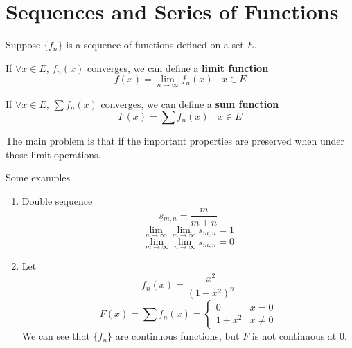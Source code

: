 \section{Sequences and Series of Functions}
    \begin{defi}
        Suppose $\{f_n\}$ is a sequence of functions defined on a set $E$. 
        
        If $\forall x \in E$, $f_n(x)$ converges, we can define a \textbf{limit function}
        \begin{equation}
            f(x) = \lim_{n \to \infty} f_n(x) \ \ \ \ x \in E
        \end{equation}

        If $\forall x \in E$, $\sum f_n(x)$ converges, we can define a \textbf{sum function}
        \begin{equation}
            F(x) = \sum f_n(x) \ \ \ \ x \in E
        \end{equation}
    \end{defi}

    The main problem is that if the important properties are preserved when under those limit operations.

    Some examples
    \begin{enumerate}
        \item Double sequence
        \begin{equation}
            s_{m,n} = \frac{m}{m+n}
        \end{equation}
        \begin{equation}
            \lim_{n \to \infty}\lim_{m \to \infty} s_{m,n} = 1
        \end{equation}
        \begin{equation}
            \lim_{m \to \infty}\lim_{n \to \infty} s_{m,n} = 0
        \end{equation}

        \item Let
        \begin{equation}
            f_n(x) = \frac{x^2}{(1+x^2)^n}
        \end{equation}
        \begin{equation}
            F(x) = \sum f_n(x) = \begin{cases}
                0 & x = 0 \\
                1+x^2 & x \neq 0
            \end{cases}
        \end{equation}
        We can see that $\{f_n\}$ are continuous functions, but $F$ is not continuous at $0$.
    \end{enumerate}

